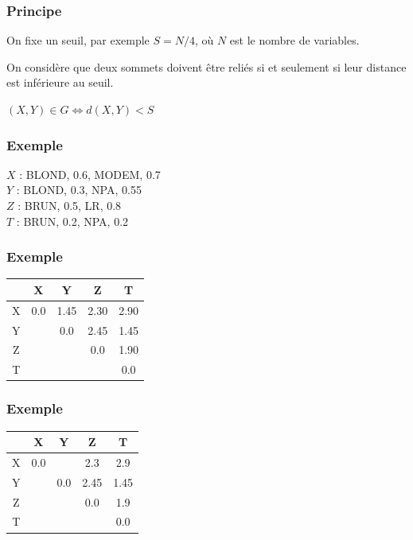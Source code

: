 \documentclass[11pt]{beamer}
\newenvironment{slide}[1]{%
\begin{frame}[environment=slide]
\frametitle{#1}
}{%
\end{frame}
}
\begin{document}
\begin{slide}{Principe}

On fixe un seuil, par exemple $S=N/4$, où $N$ est le nombre de variables.

\pause

On considère que deux sommets doivent être reliés si et seulement si leur distance est inférieure au seuil.

$(X,Y) \in G \Longleftrightarrow d(X,Y) < S$

\end{slide}

\begin{slide}{Exemple}

$X$ : BLOND, 0.6, MODEM, 0.7\\
$Y$ : BLOND, 0.3, NPA, 0.55\\
$Z$ : BRUN, 0.5, LR, 0.8\\
$T$ : BRUN, 0.2, NPA, 0.2\\

\end{slide}

\begin{slide}{Exemple}

\begin{tabular}{|c|c|c|c|c|}
\hline
& X & Y & Z & T \\ \hline
X &\cellcolor{black!20} \color{black!20} 0.0&1.45&2.30&2.90 \\ \hline
Y &&\cellcolor{black!20} \color{black!20} 0.0&2.45&1.45 \\ \hline
Z &&&\cellcolor{black!20} \color{black!20} 0.0&1.90 \\ \hline
T &&&&\cellcolor{black!20} \color{black!20} 0.0 \\ \hline
\end{tabular}

\end{slide}

\begin{slide}{Exemple}

\begin{tabular}{|c|c|c|c|c|}
\hline
& X & Y & Z & T \\ \hline
X &\cellcolor{black!20} \color{black!20} 0.0&\cellcolor{red!50}{1.45}&2.3&2.9 \\ \hline
Y &&\cellcolor{black!20} \color{black!20} 0.0&2.45&\cellcolor{red!50}1.45 \\ \hline
Z &&&\cellcolor{black!20} \color{black!20} 0.0&\cellcolor{red!50}1.9 \\ \hline
T &&&&\cellcolor{black!20} \color{black!20} 0.0 \\ \hline
\end{tabular}

\end{slide}
\end{document}
